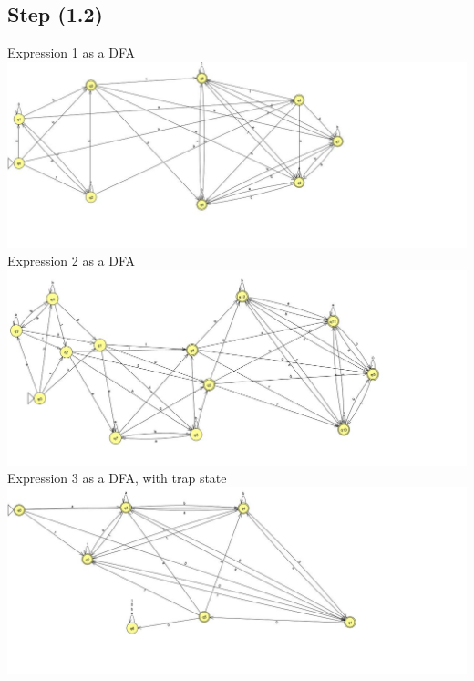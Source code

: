 \documentclass{article}
\theoremstyle{remark}
\numberwithin{equation}{section}
\begin{document}
	\subsection*{Step (1.2)}
	\noindent Expression 1 as a DFA\\
	\includegraphics[width=\textwidth]{E1_DFA.jpg}\\
	\noindent Expression 2 as a DFA\\
	\includegraphics[width=\textwidth]{E2_DFA.jpg}\\
	\noindent Expression 3 as a DFA, with trap state\\
	\includegraphics[width=\textwidth]{E3_DFA.jpg}\\
\end{document}
